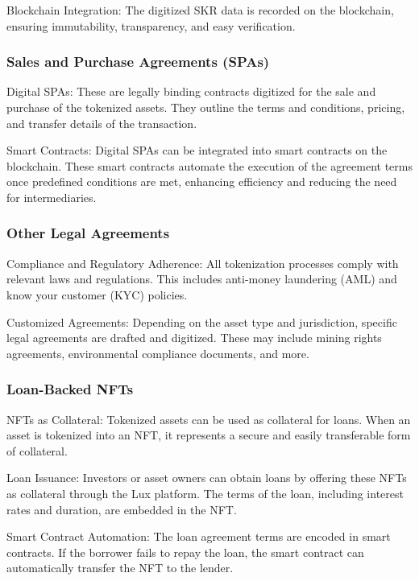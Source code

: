 \documentclass[11pt]{article}
\begin{document}
Blockchain Integration: The digitized SKR data is recorded on the blockchain, ensuring immutability, transparency, and easy verification.


\subsubsection{Sales and Purchase Agreements (SPAs)}

Digital SPAs: These are legally binding contracts digitized for the sale and purchase of the tokenized assets. They outline the terms and conditions, pricing, and transfer details of the transaction.


Smart Contracts: Digital SPAs can be integrated into smart contracts on the blockchain. These smart contracts automate the execution of the agreement terms once predefined conditions are met, enhancing efficiency and reducing the need for intermediaries.


\subsubsection{Other Legal Agreements}

Compliance and Regulatory Adherence: All tokenization processes comply with relevant laws and regulations. This includes anti-money laundering (AML) and know your customer (KYC) policies.


Customized Agreements: Depending on the asset type and jurisdiction, specific legal agreements are drafted and digitized. These may include mining rights agreements, environmental compliance documents, and more.


\subsubsection{Loan-Backed NFTs}

NFTs as Collateral: Tokenized assets can be used as collateral for loans. When an asset is tokenized into an NFT, it represents a secure and easily transferable form of collateral.


Loan Issuance: Investors or asset owners can obtain loans by offering these NFTs as collateral through the Lux platform. The terms of the loan, including interest rates and duration, are embedded in the NFT.


Smart Contract Automation: The loan agreement terms are encoded in smart contracts. If the borrower fails to repay the loan, the smart contract can automatically transfer the NFT to the lender.
\end{document}
